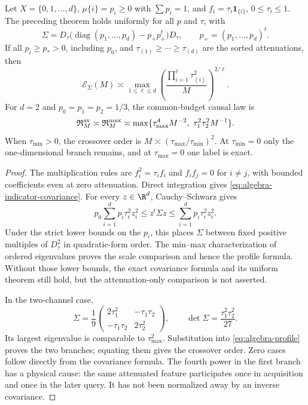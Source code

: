 \begin{corollary}
\label{cor:algebra-attenuation}
Let $X=\{0,1,\ldots,d\}$, $\mu\{i\}=p_i\ge0$ with $\sum p_i=1$,
and $f_i=\tau_i\mathbf1_{\{i\}}$, $0\le\tau_i\le1$.
The preceding theorem holds uniformly for all $p$ and $\tau$, with
\begin{equation}\label{eq:algebra-indicator-covariance}
 \Sigma=D_\tau\bigl(\operatorname{diag}(p_1,\ldots,p_d)-p_+p_+^t\bigr)D_\tau,
 \qquad p_+=(p_1,\ldots,p_d)^t.
\end{equation}
If all $p_i\ge p_*>0$, including $p_0$, and
$\tau_{(1)}\ge\cdots\ge\tau_{(d)}$ are the sorted attenuations, then
\[
 \mathcal E_\Sigma(M)\asymp
 \max_{1\le\ell\le d}
       \left(\frac{\prod_{i=1}^\ell\tau_{(i)}^2}{M}\right)^{2/\ell}.
\]
For $d=2$ and $p_0=p_1=p_2=1/3$, the common-budget causal law is
\begin{equation}\label{eq:algebra-two-channel-law}
 \mathfrak R^{\rm av}_{M}\asymp\mathfrak R^{\rm max}_{M}
 \asymp \max\{\tau_{\max}^4M^{-2},\ \tau_1^2\tau_2^2M^{-1}\}.
\end{equation}
When $\tau_{\min}>0$, the crossover order is
$M\asymp(\tau_{\max}/\tau_{\min})^2$. At $\tau_{\min}=0$
only the one-dimensional branch remains, and at $\tau_{\max}=0$
one label is exact.
\end{corollary}
\begin{proof}
The multiplication rules are $f_i^2=\tau_i f_i$ and $f_if_j=0$
for $i\ne j$, with bounded coefficients even at zero attenuation.
Direct integration gives \eqref{eq:algebra-indicator-covariance}.
For every $z\in\R^d$, Cauchy--Schwarz gives
\[
 p_0\sum_{i=1}^d p_i\tau_i^2z_i^2
 \le z^t\Sigma z\le\sum_{i=1}^d p_i\tau_i^2z_i^2.
\]
Under the strict lower bounds on the $p_i$, this places $\Sigma$
between fixed positive multiples of $D_\tau^2$ in quadratic-form
order. The min--max characterization of ordered eigenvalues proves
the scale comparison and hence the profile formula. Without those
lower bounds, the exact covariance formula and its uniform theorem
still hold, but the attenuation-only comparison is not asserted.

In the two-channel case,
\[
 \Sigma=\frac19\begin{pmatrix}2\tau_1^2&-\tau_1\tau_2\\
                      -\tau_1\tau_2&2\tau_2^2\end{pmatrix},
 \qquad \det\Sigma=\frac{\tau_1^2\tau_2^2}{27}.
\]
Its largest eigenvalue is comparable to $\tau_{\max}^2$.
Substitution into \eqref{eq:algebra-profile} proves the two branches;
equating them gives the crossover order. Zero cases follow directly
from the covariance formula. The fourth power in the first branch
has a physical cause: the same attenuated feature participates once
in acquisition and once in the later query. It has not been normalized
away by an inverse covariance.
\end{proof}

